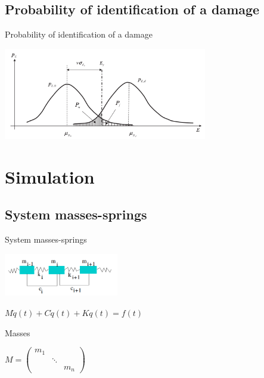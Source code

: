 \documentclass{beamer}
\begin{document}
\subsection{Probability of identification of a damage}
\begin{frame}{Probability of identification of a damage}
\begin{center}
\includegraphics[height=4cm]{images/gaussiennes.png}
\end{center}
\end{frame}






\section{Simulation}

\subsection{System masses-springs}
\begin{frame}{System masses-springs}
\begin{center}
\includegraphics[width=5cm]{images/ressorts.png}

$M \ddot{q}(t) + C \dot{q}(t) + K q(t) = f(t)$
\end{center}

\pause

\begin{exampleblock}{Masses}
\begin{center}
$
M = 
\begin{pmatrix} 
m_1\\ 
&\ddots\\ 
&&m_n
\end{pmatrix}
$
\end{center}
\end{exampleblock}

\end{frame}
\end{document}
